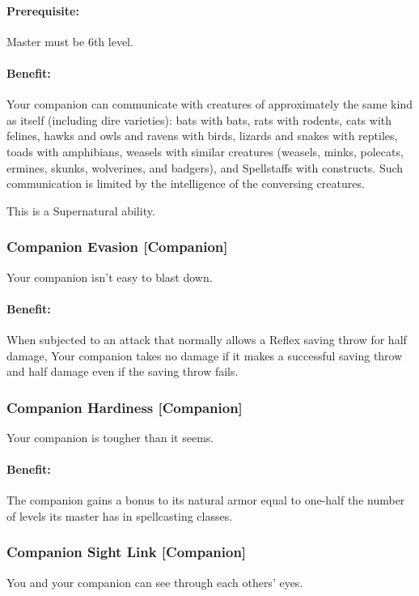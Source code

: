 \paragraph{Prerequisite:} Master must be 6th level.

\paragraph{Benefit:} Your companion can communicate with creatures of approximately the same kind as itself (including dire varieties): 
bats with bats, rats with rodents, cats with felines, hawks and owls and ravens with birds, 
lizards and snakes with reptiles, toads with amphibians, weasels with similar creatures (weasels, minks, polecats, ermines, skunks, wolverines, and badgers), and Spellstaffs with constructs. 
Such communication is limited by the intelligence of the conversing creatures. 

This is a Supernatural ability.
\subsubsection[Companion Evasion]{Companion Evasion [Companion]}
\label{Feat:CompanionEvasion}
Your companion isn't easy to blast down.

\paragraph{Benefit:} When subjected to an attack that normally allows a Reflex saving throw for half damage, 
Your companion takes no damage if it makes a successful saving throw and half damage even if the saving throw fails. 

\subsubsection[Companion Hardiness]{Companion Hardiness [Companion]}
\label{Feat:CompanionHardiness}
Your companion is tougher than it seems.

\paragraph{Benefit:} The companion gains a bonus to its natural armor equal to one-half the number of levels its master has in spellcasting classes.

\subsubsection[Companion Sight Link]{Companion Sight Link [Companion]}
\label{Feat:CompanionSightLink}
You and your companion can see through each others' eyes.


